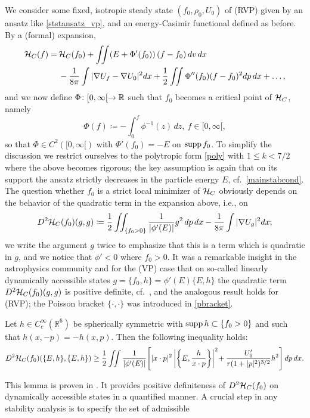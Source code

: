 \documentclass[11pt]{article}
\begin{document}
We consider some fixed, isotropic steady state $(f_0,\rho_0,U_0)$ of (RVP)
given by an ansatz like \eqref{ststansatz_vp}, and 
an energy-Casimir functional defined as before. By a (formal) expansion,
\begin{align*}
  {\cal H}_C (f) = \,
  &
  {\cal H}_C (f_0) + 
  \iint (E + \Phi'(f_0))\,(f-f_0)  \,dv\,dx \nonumber \\
  & 
  {}- \frac{1}{8 \pi} \int|\nabla U_f-\nabla U_0 |^2 dx 
  + \frac{1}{2} \iint \Phi''(f_0) (f-f_0)^2 dp\,dx 
  + \ldots,
\end{align*}
and we now define
$\Phi\colon [0,\infty[ \to \mathbb R$ such that $f_0$ becomes a critical point
of ${\cal H}_C$, namely 
\[ 
\Phi(f)\coloneqq -\int_0^f\phi^{-1}(z)\,dz,\ f\in [0,\infty[,
\]
so that $\Phi\in C^2([0,\infty[)$ with $\Phi'(f_0) = - E$ on $\mathrm{supp}\, f_0$.
To simplify the discussion
we restrict ourselves to the polytropic form \eqref{poly} with
$1\leq k < 7/2$ where the above becomes rigorous;
the key assumption is again that on its support the ansatz strictly
decreases in the particle energy $E$, cf.~\eqref{mainstabcond}.
The question whether $f_0$ is a strict local minimizer of ${\cal H}_C$ obviously
depends on the behavior of the quadratic term in the expansion above,
i.e., on
\[
D^2{\cal H}_C (f_0)(g,g) \coloneqq  \frac{1}{2}\iint_{\{f_{0}>0\}}
\frac{1}{|\phi'(E)|} g^2\, dp\, dx 
-\frac{1}{8\pi}\int |\nabla U_{g}|^2 dx;  
\]
we write the argument $g$ twice to emphasize that this is a term
which is quadratic in $g$, and we notice that $\phi'<0$ where $f_0>0$.
It was a remarkable insight in the astrophysics community and for the (VP) case
that on so-called linearly dynamically accessible states
$g=\{f_0,h\}=\phi'(E)\{E,h\}$ the quadratic term
$D^2{\cal H}_C (f_0)(g,g)$ is positive definite, cf.~\cite{KS,SDLP}, and the analogous
result holds for (RVP); the Poisson bracket $\{\cdot,\cdot\}$ was introduced in
\eqref{pbracket}.
%
\begin{lemma}\label{kandrup_rvp}
  Let $h\in C_c^{\infty}(\mathbb R^6)$ be spherically symmetric 
  with $\mathrm{supp}\, h \subset \{f_0>0\}$ and such that $h(x,-p)=-h(x,p)$. 
  Then the following inequality holds:
  \[
  D^2{\cal H}_C(f_0)(\{E,h\},\{E,h\})
  \geq
  \frac{1}{2} \iint \frac{1}{|\phi'(E)|}
  \!\left[|x\cdot p|^2 \left|\left\{E,\frac{h}{x\cdot p}\right\}\right|^2
  \!+\frac{U_0'}{r(1+|p|^2)^{3/2}}h^2\right] dp\,dx.
  \]
\end{lemma}
%
This lemma is proven in \cite[Lemma~3.4]{HaRe2007}. It provides 
positive definiteness of $D^2{\cal H}_C (f_0)$
on dynamically accessible states in a quantified manner.
A crucial step in any stability analysis is to specify the set of admissible
\end{document}
